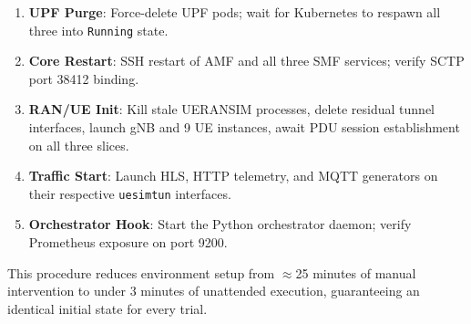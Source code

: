 \begin{enumerate}[noitemsep, topsep=4pt]
  \item \textbf{UPF Purge}: Force-delete UPF pods; wait for Kubernetes to
        respawn all three into \texttt{Running} state.
  \item \textbf{Core Restart}: SSH restart of AMF and all three SMF services;
        verify SCTP port 38412 binding.
  \item \textbf{RAN/UE Init}: Kill stale UERANSIM processes, delete residual
        tunnel interfaces, launch gNB and 9 UE instances, await PDU session
        establishment on all three slices.
  \item \textbf{Traffic Start}: Launch HLS, HTTP telemetry, and MQTT generators
        on their respective \texttt{uesimtun} interfaces.
  \item \textbf{Orchestrator Hook}: Start the Python orchestrator daemon; verify
        Prometheus exposure on port 9200.
\end{enumerate}

This procedure reduces environment setup from $\approx$25 minutes of manual
intervention to under 3 minutes of unattended execution, guaranteeing an
identical initial state for every trial.
